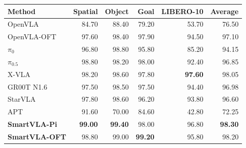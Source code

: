 \begin{center}
\begin{minipage}{\linewidth}
\centering
\setlength{\belowcaptionskip}{\baselineskip}
\label{tab:libero}
\normalsize
\setlength{\tabcolsep}{4pt}
\begin{tabular}{@{}lrrrrr@{}}
\toprule
Method & Spatial & Object & Goal & LIBERO-10 & Average \\
\midrule
OpenVLA & 84.70 & 88.40 & 79.20 & 53.70 & 76.50 \\
OpenVLA-OFT & 97.60 & 98.40 & 97.90 & 94.50 & 97.10 \\
$\pi_{0}$ & 96.80 & 98.80 & 95.80 & 85.20 & 94.15 \\
$\pi_{0.5}$ & 98.80 & 98.20 & 98.00 & 92.40 & 96.85 \\
X-VLA & 98.20 & 98.60 & 97.80 & \textbf{97.60} & 98.05 \\
GR00T N1.6 & 97.50 & 98.50 & 97.50 & 94.40 & 96.98 \\
StarVLA & 97.80 & 98.60 & 96.20 & 93.80 & 96.60 \\
APT & 91.60 & 70.00 & 84.60 & 42.80 & 72.25 \\
\midrule
\rowcolor{smartvlarow}
\textbf{SmartVLA-Pi} & \textbf{99.00} & \textbf{99.40} & 98.00 & 96.80 & \textbf{98.30} \\
\rowcolor{smartvlarow}
\textbf{SmartVLA-OFT} & 98.80 & 99.00 & \textbf{99.20} & 95.80 & 98.20 \\
\bottomrule
\end{tabular}
\end{minipage}
\end{center}
